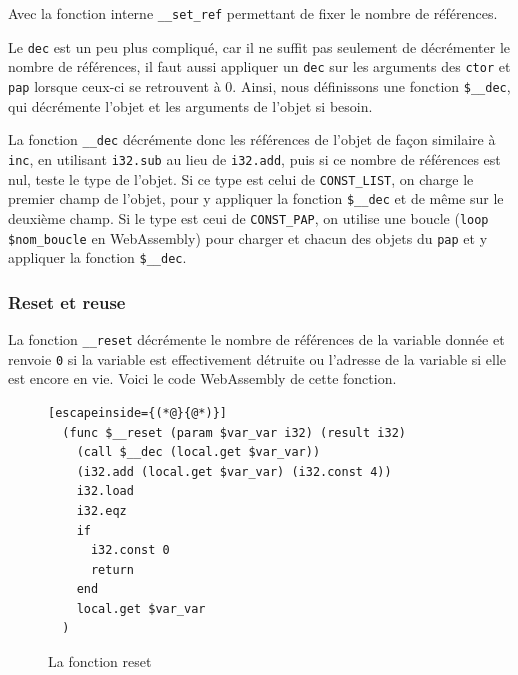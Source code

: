 \documentclass{rapportECL}
\begin{document}
Avec la fonction interne \verb|__set_ref| permettant de fixer le nombre de références.


Le \verb|dec| est un peu plus compliqué, car il ne suffit pas seulement de décrémenter le nombre de références, il faut aussi appliquer un \verb|dec| sur les arguments des \verb|ctor| et \verb|pap| lorsque ceux-ci se retrouvent à 0.
Ainsi, nous définissons une fonction \verb|$__dec|, qui décrémente l'objet et les arguments de l'objet si besoin.

La fonction \verb|__dec| décrémente donc les références de l'objet de façon similaire à \verb|inc|, en utilisant \verb|i32.sub| au lieu de \verb|i32.add|, puis si ce nombre de références est nul, teste le type de l'objet. Si ce type est celui de \verb|CONST_LIST|, on charge le premier champ de l'objet, pour y appliquer la fonction \verb|$__dec| et de même sur le deuxième champ. Si le type est ceui de \verb|CONST_PAP|, on utilise une boucle (\verb|loop $nom_boucle| en WebAssembly) pour charger et chacun des objets du \verb|pap| et y appliquer la fonction \verb|$__dec|.

\subsubsection{Reset et reuse}

La fonction \verb|__reset| décrémente le nombre de références de la variable donnée et renvoie \verb|0| si la variable est effectivement détruite ou l'adresse de la variable si elle est encore en vie. Voici le code WebAssembly de cette fonction.

\begin{figure}[H]
	\begin{lstlisting}[escapeinside={(*@}{@*)}]
  (func $__reset (param $var_var i32) (result i32)
    (call $__dec (local.get $var_var))
    (i32.add (local.get $var_var) (i32.const 4))
    i32.load
    i32.eqz
    if
      i32.const 0
      return
    end
    local.get $var_var
  )
	\end{lstlisting}
	\caption{La fonction reset}
	\label{listing:compile_reset}
\end{figure}
\end{document}
